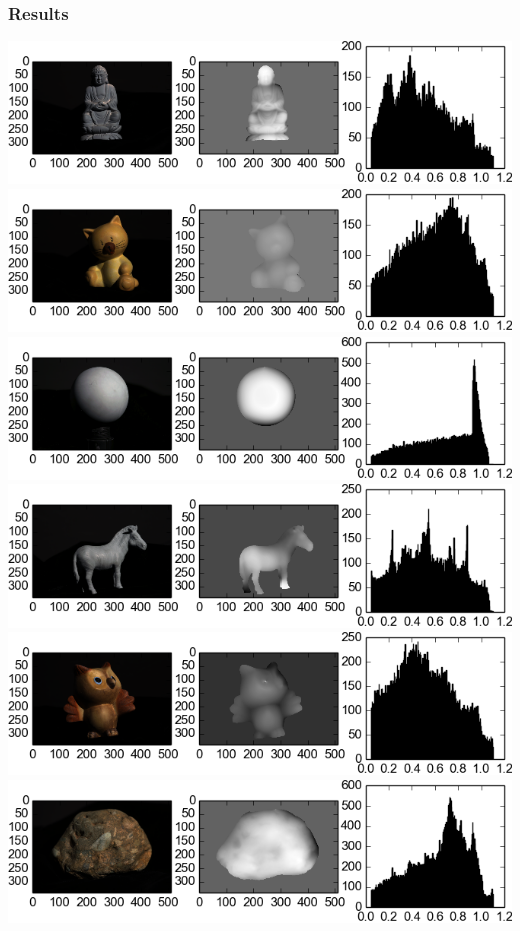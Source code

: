 \documentclass{paper}
\begin{document}
\subsubsection{Results}
\includegraphics[width=1\linewidth]{out/buddha_depth.png}
\includegraphics[width=1\linewidth]{out/cat_depth.png}
\includegraphics[width=1\linewidth]{out/gray_depth.png}
\includegraphics[width=1\linewidth]{out/horse_depth.png}
\includegraphics[width=1\linewidth]{out/owl_depth.png}
\includegraphics[width=1\linewidth]{out/rock_depth.png}
\end{document}
